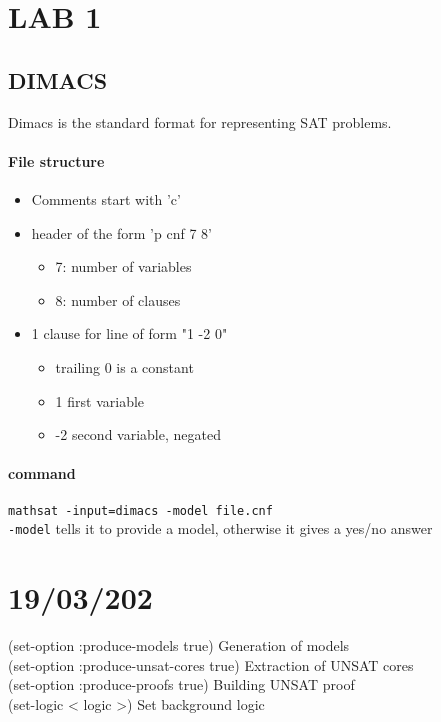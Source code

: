 \section{LAB 1}
\subsection{DIMACS}
Dimacs is the standard format for representing SAT problems.
\paragraph{File structure}
\begin{itemize}
    \item Comments start with 'c'
    \item header of the form 'p cnf 7 8'
        \begin{itemize}
            \item 7: number of variables
            \item 8: number of clauses
        \end{itemize}
    \item 1 clause for line of form "1 -2 0"
        \begin{itemize}
            \item trailing 0 is a constant
            \item 1 first variable
            \item -2 second variable, negated
        \end{itemize}
\end{itemize}

\paragraph{command}
\texttt{mathsat -input=dimacs -model file.cnf}\\
\texttt{-model} tells it to provide a model, otherwise it gives a yes/no answer

\section{19/03/202}
(set-option :produce-models true) Generation of models \\
(set-option :produce-unsat-cores true) Extraction of UNSAT cores \\
(set-option :produce-proofs true) Building UNSAT proof \\
(set-logic < logic >) Set background logic \\


